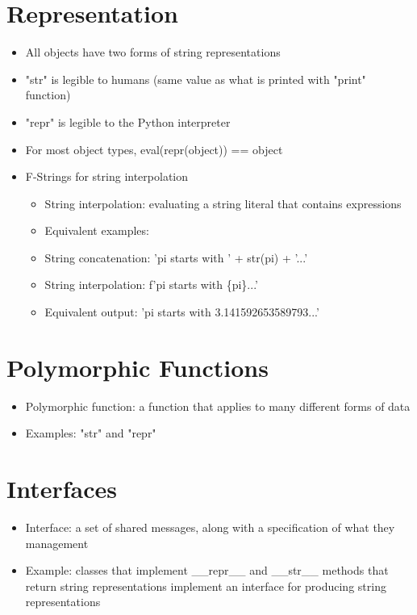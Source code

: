 \section{Representation}
\begin{itemize}
    \item All objects have two forms of string representations
    \item "str" is legible to humans (same value as what is printed with "print" function)
    \item "repr" is legible to the Python interpreter
    \item For most object types, eval(repr(object)) == object
    \item F-Strings for string interpolation
    \begin{itemize}
        \item String interpolation: evaluating a string literal that contains expressions
        \item Equivalent examples:
        \item String concatenation: 'pi starts with ' + str(pi) + '...'
        \item String interpolation: f'pi starts with \{pi\}...'
        \item Equivalent output: 'pi starts with 3.141592653589793...'
    \end{itemize}
\end{itemize}

\section{Polymorphic Functions}
\begin{itemize}
    \item Polymorphic function: a function that applies to many different forms of data
    \item Examples: "str" and "repr"
\end{itemize}

\section{Interfaces}
\begin{itemize}
    \item Interface: a set of shared messages, along with a specification of what they management
    \item Example: classes that implement \_\_repr\_\_ and \_\_str\_\_ methods that return string representations implement an interface for producing string representations
\end{itemize}

